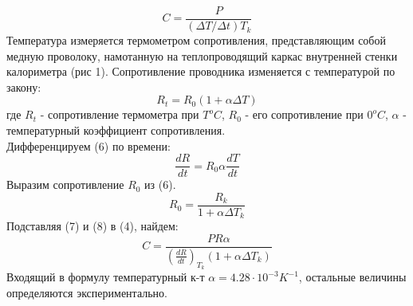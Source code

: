 \documentclass[a4paper]{article}
\begin{document}
	\begin{equation}
	C=\frac{P}{(\Delta T/\Delta t) T_k}
	\end{equation}
	Температура измеряется термометром сопротивления, представляющим собой медную проволоку, намотанную на теплопроводящий каркас внутренней стенки калориметра (рис 1). Сопротивление проводника изменяется с температурой по закону:
	\begin{equation}
	R_t = R_0 (1+\alpha \Delta T)
	\end{equation}
	где $R_t$ - сопротивление термометра при $T^o C$, $R_0$ - его сопротивление при $0^o C$, $\alpha$ - температурный коэффициент сопротивления.\\ Дифференцируем (6) по времени:
	\begin{equation}
	\frac{dR}{dt}=R_0 \alpha \frac{dT}{dt}
	\end{equation}
	Выразим сопротивление $R_0$ из (6).
	\begin{equation}
	R_0=\frac{R_k}{1+\alpha \Delta T_k}
	\end{equation}
	Подставляя (7) и (8) в (4), найдем:
	\begin{equation}
	C=\frac{PR\alpha}{(\frac{dR}{dt})_{T_k} (1+\alpha \Delta T_k)}
	\end{equation}
	Входящий в формулу температурный к-т $\alpha = 4.28 \cdot 10^{-3} K^{-1}$, остальные величины определяются экспериментально. 
\end{document}
